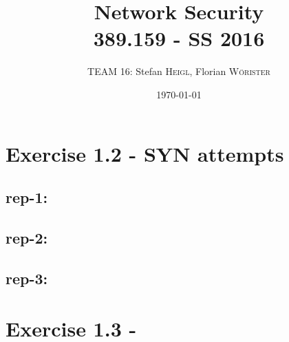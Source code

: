 \documentclass{article}
\title{Network Security \\ 389.159 - SS 2016} %
\author{TEAM 16: Stefan \textsc{Heigl}, Florian \textsc{Wörister}} %
\date{\today} %
\begin{document}
\maketitle %

\section*{Exercise 1.2 - SYN attempts}
\subsection*{rep-1:}
\subsection*{rep-2:}
\subsection*{rep-3:}

\section*{Exercise 1.3 - }
\end{document}
